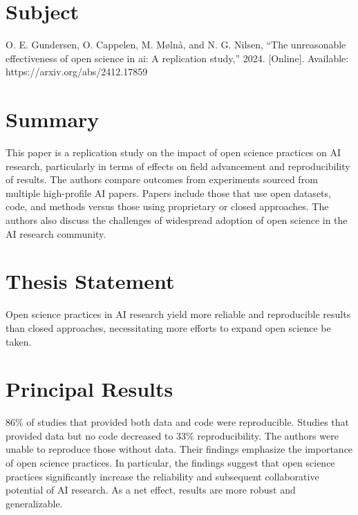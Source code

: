 \documentclass[12pt, letterpaper]{article}
\begin{document}
\pagestyle{empty}
\singlespacing
\vspace{1.0cm}

\newgeometry{} %


\section{Subject}
\label{sec:subject}
O. E. Gundersen, O. Cappelen, M. Mølnå, and N. G. Nilsen, “The unreasonable effectiveness of open science in ai: A replication study,” 2024. [Online]. Available: https://arxiv.org/abs/2412.17859

\section{Summary}
\label{sec:summary}
This paper is a replication study on the impact of open science practices on AI research, particularly in terms of effects on field advancement and reproducibility of results. The authors compare outcomes from experiments sourced from multiple high-profile AI papers. Papers include those that use open datasets, code, and methods versus those using proprietary or closed approaches. The authors also discuss the challenges of widespread adoption of open science in the AI research community.

\section{Thesis Statement}
\label{sec:thesis}
Open science practices in AI research yield more reliable and reproducible results than closed approaches, necessitating more efforts to expand open science be taken.

\section{Principal Results}
\label{sec:principal}
86\% of studies that provided both data and code were reproducible. Studies that provided data but no code decreased to 33\% reproducibility. The authors were unable to reproduce those without data. Their findings emphasize the importance of open science practices. In particular, the findings suggest that open science practices significantly increase the reliability and subsequent collaborative potential of AI research. As a net effect, results are more robust and generalizable. 
\end{document}
